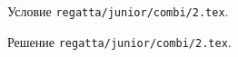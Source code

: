 Условие \texttt{regatta/junior/combi/2.tex}.

\solution Решение \texttt{regatta/junior/combi/2.tex}.

